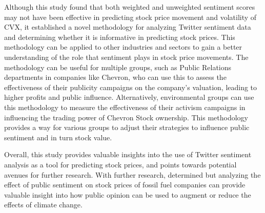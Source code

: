 \documentclass[12pt, letterpaper, titlepage]{article}
\newcommand{\jy}[1]{\textcolor{blue}{JY: #1}}
\begin{document}
Although this study found that both weighted and unweighted sentiment scores may not have been effective in predicting stock price movement and volatility of CVX, it established a novel methodology for analyzing Twitter sentiment data and determining whether it is informative in predicting stock prices. This methodology can be applied to other industries and sectors to gain a better understanding of the role that sentiment plays in stock price movements. The methodology can be useful for multiple groups, such as Public Relations departments in companies like Chevron, who can use this to assess the effectiveness of their publicity campaigns on the company's valuation, leading to higher profits and public influence. Alternatively, environmental groups can use this methodology to measure the effectiveness of their activism campaigns in influencing the trading power of Chevron Stock ownership. This methodology provides a way for various groups to adjust their strategies to influence public sentiment and in turn stock value.

Overall, this study provides valuable insights into the use of Twitter sentiment analysis as a tool for predicting stock prices, and points towards potential avenues for further research. With further research, determined but analyzing the effect of public sentiment on stock prices of fossil fuel companies can provide valuable insight into how public opinion can be used to augment or reduce the effects of climate change.




\end{document}

